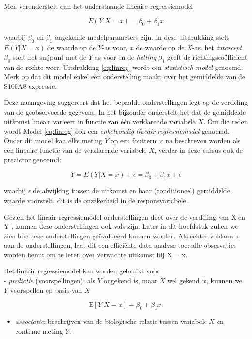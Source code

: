 \documentclass[
  12pt,dutch]{book}
\providecommand{\tightlist}{%
  \setlength{\itemsep}{0pt}\setlength{\parskip}{0pt}}
\theoremstyle{definition}
\theoremstyle{definition}
\theoremstyle{definition}
\theoremstyle{definition}
\theoremstyle{remark}
\begin{document}
Men veronderstelt dan het onderstaande lineaire regressiemodel

\begin{equation}
E(Y|X =x)=\beta_0 + \beta_1 x  \label{eq:linreg}
\end{equation}

waarbij \(\beta_0\) en \(\beta_1\) ongekende modelparameters zijn. In deze uitdrukking
stelt \(E(Y|X=x)\) de waarde op de \(Y\)-as voor, \(x\) de waarde op de \(X\)-as,
het \emph{intercept} \(\beta_0\) stelt het snijpunt met de \(Y\)-as voor en de
\emph{helling} \(\beta_1\) geeft de richtingscoëfficiënt van de rechte weer.
Uitdrukking \eqref{eq:linreg} wordt een \emph{statistisch model} genoemd.
Merk op dat dit model enkel een onderstelling maakt over het gemiddelde van de S100A8 expressie.

Deze naamgeving suggereert dat het bepaalde onderstellingen legt op de
verdeling van de geobserveerde gegevens. In het bijzonder onderstelt het dat
de gemiddelde uitkomst lineair varieert in functie van één verklarende variabele \(X\). Om
die reden wordt Model \eqref{eq:linreg} ook een \emph{enkelvoudig lineair regressiemodel} genoemd.
Onder dit model kan elke meting \(Y\) op een foutterm
\(\epsilon\) na beschreven worden als een lineaire functie van de verklarende
variabele \(X\), verder in deze cursus ook de predictor genoemd:

\[Y=E(Y|X=x)+\epsilon=\beta_0+\beta_1 x+\epsilon\]

waarbij \(\epsilon\) de afwijking tussen de uitkomst en haar (conditioneel)
gemiddelde waarde voorstelt, dit is de onzekerheid in de responsvariabele.

Gezien het lineair regressiemodel onderstellingen doet over de verdeling van X en Y , kunnen deze onderstellingen ook vals zijn. Later in dit hoofdstuk zullen we zien hoe deze onderstellingen geëvalueerd kunnen worden. Als echter voldaan is aan de onderstellingen, laat dit een efficiënte data-analyse toe: alle observaties worden benut om te leren over verwachte uitkomst bij X = x.

Het lineair regressiemodel kan worden gebruikt voor\\
- \emph{predictie} (voorspellingen): als \(Y\) ongekend is, maar \(X\) wel gekend is, kunnen we \(Y\) voorspellen op basis van \(X\)

\[\text{E}\left[Y|X =x\right]=\beta_0 + \beta_1 x.\]

\begin{itemize}
\tightlist
\item
  \emph{associatie}: beschrijven van de biologische relatie tussen variabele \(X\) en continue meting \(Y\):
\end{itemize}
\end{document}
